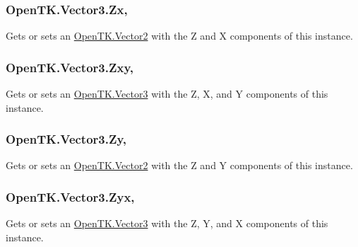 \hypertarget{struct_open_t_k_1_1_vector3_aed5a7595e31e263f5fc64397af2ebf74}{
\subsubsection[{Zx}]{ Open\-T\-K.\-Vector3.\-Zx\hspace{0.3cm}{\ttfamily [get]}, {\ttfamily [set]}}}\label{struct_open_t_k_1_1_vector3_aed5a7595e31e263f5fc64397af2ebf74}


Gets or sets an \hyperlink{struct_open_t_k_1_1_vector2}{Open\-T\-K.\-Vector2} with the Z and X components of this instance. 

\hypertarget{struct_open_t_k_1_1_vector3_a9024fb2595a67c4f1ab7dc6b8e2dbb0e}{
\subsubsection[{Zxy}]{ Open\-T\-K.\-Vector3.\-Zxy\hspace{0.3cm}{\ttfamily [get]}, {\ttfamily [set]}}}\label{struct_open_t_k_1_1_vector3_a9024fb2595a67c4f1ab7dc6b8e2dbb0e}


Gets or sets an \hyperlink{struct_open_t_k_1_1_vector3}{Open\-T\-K.\-Vector3} with the Z, X, and Y components of this instance. 

\hypertarget{struct_open_t_k_1_1_vector3_a8ec9f31766bde650eddd5a617f0758a9}{
\subsubsection[{Zy}]{ Open\-T\-K.\-Vector3.\-Zy\hspace{0.3cm}{\ttfamily [get]}, {\ttfamily [set]}}}\label{struct_open_t_k_1_1_vector3_a8ec9f31766bde650eddd5a617f0758a9}


Gets or sets an \hyperlink{struct_open_t_k_1_1_vector2}{Open\-T\-K.\-Vector2} with the Z and Y components of this instance. 

\hypertarget{struct_open_t_k_1_1_vector3_a659b53e7c8b5f305b8b8f3faa8325b05}{
\subsubsection[{Zyx}]{ Open\-T\-K.\-Vector3.\-Zyx\hspace{0.3cm}{\ttfamily [get]}, {\ttfamily [set]}}}\label{struct_open_t_k_1_1_vector3_a659b53e7c8b5f305b8b8f3faa8325b05}


Gets or sets an \hyperlink{struct_open_t_k_1_1_vector3}{Open\-T\-K.\-Vector3} with the Z, Y, and X components of this instance. 

